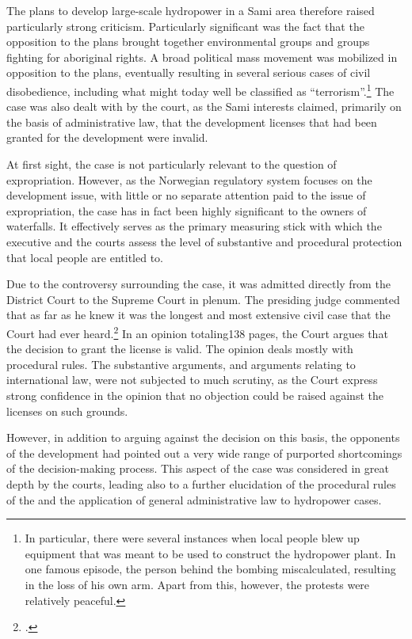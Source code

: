 The plans to develop large-scale hydropower in a Sami area therefore raised particularly strong criticism. Particularly significant was the fact that the opposition to the plans brought together environmental groups and groups fighting for aboriginal rights. A broad political mass movement was mobilized in opposition to the plans, eventually resulting in several serious cases of civil disobedience, including what might today well be classified as ``terrorism''.\footnote{In particular, there were several instances when local people blew up equipment that was meant to be used to construct the hydropower plant. In one famous episode, the person behind the bombing miscalculated, resulting in the loss of his own arm. Apart from this, however, the protests were relatively peaceful.}
The case was also dealt with by the court, as the Sami interests claimed, primarily on the basis of administrative law, that the development licenses that had been granted for the development were invalid. 

At first sight, the case is not particularly relevant to the question of expropriation. However, as the Norwegian regulatory system focuses on the development issue, with little or no separate attention paid to the issue of expropriation, the case has in fact been highly significant to the owners of waterfalls. It effectively serves as the primary measuring stick with which the executive and the courts assess the level of substantive and procedural protection that local people are entitled to.

Due to the controversy surrounding the case, it was admitted directly from the District Court to the Supreme Court in plenum. The presiding judge commented that as far as he knew it was the longest and most extensive civil case that the Court had ever heard.\footcite[254]{alta82} In an opinion totaling138 pages, the Court argues that the decision to grant the license is valid. The opinion deals mostly with procedural rules. The substantive arguments, and arguments relating to international law, were not subjected to much scrutiny, as the Court express strong confidence in the opinion that no objection could be raised against the licenses on such grounds. 

However, in addition to arguing against the decision on this basis, the opponents of the development had pointed out a very wide range of purported shortcomings of the decision-making process. This aspect of the case was considered in great depth by the courts, leading also to a further elucidation of the procedural rules of the \cite{wra17} and the application of general administrative law to hydropower cases.

